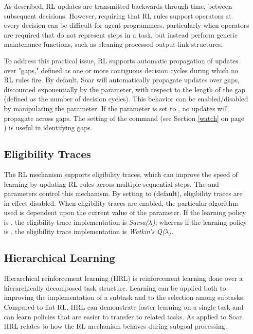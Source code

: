 As described, RL updates are transmitted backwards through time, between subsequent decisions. However, requiring that RL rules support operators at every decision can be difficult for agent programmers, particularly when operators are required that do not represent steps in a task, but instead perform generic maintenance functions, such as cleaning processed output-link structures.

To address this practical issue, RL supports automatic propagation of updates over "gaps," defined as one or more contiguous decision cycles during which no RL rules fire. By default, Soar will automatically propagate updates over gaps, discounted exponentially by the  parameter, with respect to the length of the gap (defined as the number of decision cycles). This behavior can be enabled/disabled by manipulating the  parameter. If the  parameter is set to , no updates will propagate across gaps. The  setting of the  command (see Section \ref{watch} on page \pageref{watch}) is useful in identifying gaps.

\subsection{Eligibility Traces}
\label{RL-et}
The RL mechanism supports eligibility traces, which can improve the speed of learning by updating RL rules across multiple sequential steps. The  and  parameters control this mechanism. By setting  to  (default), eligibility traces are in effect disabled. When eligibility traces are enabled, the particular algorithm used is dependent upon the current value of the  parameter. If the learning policy is , the eligibility trace implementation is \emph{Sarsa($\lambda$)}; whereas if the learning policy is , the eligibility trace implementation is \emph{Watkin's Q($\lambda$)}.

\subsection{Hierarchical Learning}
\label{RL-hrl}

Hierarchical reinforcement learning (HRL) is reinforcement learning done over a hierarchically decomposed task structure. Learning can be applied both to improving the implementation of a subtask and to the selection among subtasks. Compared to flat RL, HRL can demonstrate faster learning on a single task and can learn policies that are easier to transfer to related tasks. As applied to Soar, HRL relates to how the RL mechanism behaves during subgoal processing.

